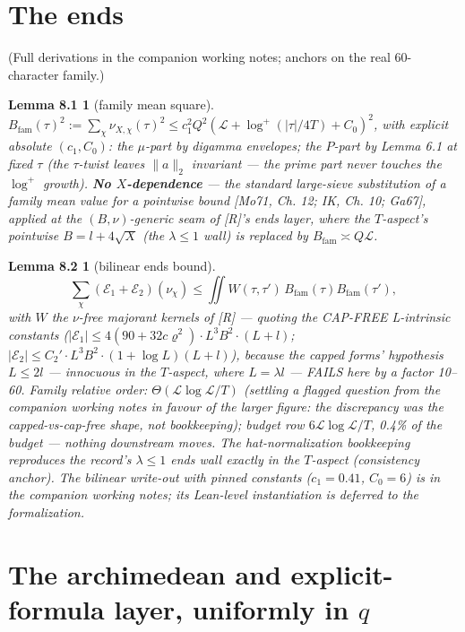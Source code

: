 \documentclass[11pt]{amsart}
\theoremstyle{plain}
\newtheorem*{lemmaeightone}{Lemma 8.1}
\newtheorem*{lemmaeighttwo}{Lemma 8.2}
\theoremstyle{remark}
\begin{document}
\section{The ends}

(Full derivations in the companion working notes; anchors on the real 60-character
family.)

\begin{lemmaeightone}[family mean square]
$B_{\mathrm{fam}}(\tau)^2 := \sum_\chi \nu_{X,\chi}(\tau)^2 \le
c_1^2Q^2(\mathcal{L} + \log^{+}(|\tau|/4T) + C_0)^2$, with explicit absolute
$(c_1, C_0)$: the $\mu$-part by digamma envelopes; the $P$-part by Lemma 6.1 at fixed
$\tau$ (the $\tau$-twist leaves $\lVert a\rVert_2$ invariant --- the prime part never
touches the $\log^{+}$ growth). \textbf{No $X$-dependence} --- the standard
large-sieve substitution of a family mean value for a pointwise bound [Mo71, Ch. 12;
IK, Ch. 10; Ga67], applied at the $(B, \nu)$-generic seam of [R]'s ends layer, where
the $T$-aspect's pointwise $B = l + 4\sqrt{X}$ (the $\lambda \le 1$ wall) is replaced
by $B_{\mathrm{fam}} \asymp Q\mathcal{L}$.
\end{lemmaeightone}

\begin{lemmaeighttwo}[bilinear ends bound]
\[
\sum_\chi (\mathcal{E}_1 + \mathcal{E}_2)(\nu_\chi) \le \iint W(\tau, \tau')\,
B_{\mathrm{fam}}(\tau)B_{\mathrm{fam}}(\tau'),
\]
with $W$ the $\nu$-free majorant
kernels of [R] --- quoting the CAP-FREE L-intrinsic constants
($|\mathcal{E}_1| \le 4(90 + 32c\varrho^2)\cdot L^3B^2\cdot(L + l)$;
$|\mathcal{E}_2| \le C_2'\cdot L^3B^2\cdot(1 + \log L)(L + l)$), because the capped
forms' hypothesis $L \le 2l$ --- innocuous in the $T$-aspect, where $L = \lambda l$
--- FAILS here by a factor 10--60. Family relative order:
{\boldmath$\Theta(\mathcal{L} \log \mathcal{L}/T)$} (settling a flagged question from
the companion working notes in favour of the larger figure: the discrepancy was the
capped-vs-cap-free shape, not bookkeeping); budget row
$6\mathcal{L} \log \mathcal{L}/T$, 0.4\% of the budget --- nothing downstream moves.
The hat-normalization bookkeeping reproduces the record's $\lambda \le 1$ ends wall
exactly in the $T$-aspect (consistency anchor). The bilinear write-out with pinned
constants ($c_1 = 0.41$, $C_0 = 6$) is in the companion working notes; its Lean-level
instantiation is deferred to the formalization.
\end{lemmaeighttwo}

\section{The archimedean and explicit-formula layer, uniformly in $q$}
\end{document}
